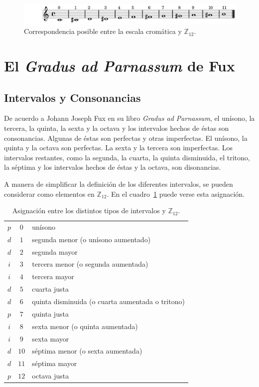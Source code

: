 \documentclass[letterpaper,12pt]{book}
\theoremstyle{definition} \newtheorem{Def}{Definición}[chapter]
\theoremstyle{definition} \newtheorem{Teo}{Teorema}[chapter]
\theoremstyle{definition} \newtheorem{Pro}{Proposición}[chapter]
\theoremstyle{definition} \newtheorem{Lema}{Lema}[chapter]
\begin{document}
\begin{figure}[h]
\centering
\includegraphics[angle=0, width=1\textwidth]{Asignacion.png}
\caption{\label{Asignacion}Correspondencia posible entre la escala cromática y $\mathbb{Z}_{12}$.}
\end{figure}

\section{El \emph{Gradus ad Parnassum} de Fux}

\subsection{Intervalos y Consonancias}

De acuerdo a Johann Joseph Fux en su libro \emph{Gradus ad Parnassum}, el unísono, la tercera, la quinta, la sexta y la octava y los intervalos hechos de éstas son consonancias. Algunas de éstas son perfectas y otras imperfectas. El unísono, la quinta y la octava son perfectas. La sexta y la tercera son imperfectas. Los intervalos restantes, como la segunda, la cuarta, la quinta disminuida, el tritono, la séptima y los intervalos hechos de éstas y la octava, son disonancias.

A manera de simplificar la definición de los diferentes intervalos, se pueden considerar como elementos en $\mathbb{Z}_{12}$. En el cuadro~\ref{CuadroIntervalos} puede verse esta asignación. 

\begin{table}[h]
\centering
\begin{tabular}{| c | c | l |}
\hline
$p$ & $0$ & unísono \\
$d$ & $1$ & segunda menor (o unísono aumentado)\\ 
$d$ & $2$ & segunda mayor \\
$i$ & $3$ & tercera menor (o segunda aumentada) \\
$i$ & $4$ & tercera mayor\\
$d$ & $5$ & cuarta justa\\
$d$ & $6$ & quinta disminuida (o cuarta aumentada o tritono) \\
$p$ & $7$ & quinta justa \\
$i$ & $8$ & sexta menor (o quinta aumentada) \\
$i$ & $9$ & sexta mayor \\
$d$ & $10$ & séptima menor (o sexta aumentada) \\
$d$ & $11$ & séptima mayor \\
$p$ & $12$ & octava justa \\
\hline
\end{tabular}
\caption{\label{CuadroIntervalos}Asignación entre los distintos tipos de intervalos y $\mathbb{Z}_{12}$.} 
\end{table}
\end{document}
